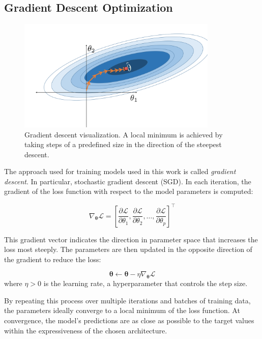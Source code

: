 \documentclass{pracalicmgr}
\begin{document}
\subsection{Gradient Descent Optimization}

\begin{figure}[H]
    \centering
    \includegraphics[width=0.85\textwidth]{src/gradienDescent.png}
    \caption{Gradient descent visualization. A local minimum is achieved by taking steps of a predefined size in the direction of the steepest descent.}
\end{figure}

The approach used for training models used in this work is called \textit{gradient descent}. In particular, stochastic gradient descent (SGD). In each iteration, the gradient of the loss function with respect to the model parameters is computed:

\[
\nabla_{\boldsymbol{\theta}} \mathcal{L} = \left[ \frac{\partial \mathcal{L}}{\partial \theta_1}, \frac{\partial \mathcal{L}}{\partial \theta_2}, \dots, \frac{\partial \mathcal{L}}{\partial \theta_p} \right]^\top
\]

This gradient vector indicates the direction in parameter space that increases the loss most steeply. The parameters are then updated in the opposite direction of the gradient to reduce the loss:

\[
\boldsymbol{\theta} \leftarrow \boldsymbol{\theta} - \eta \nabla_{\boldsymbol{\theta}} \mathcal{L}
\]
where \( \eta > 0 \) is the learning rate, a hyperparameter that controls the step size.

By repeating this process over multiple iterations and batches of training data, the parameters ideally converge to a local minimum of the loss function. At convergence, the model's predictions are as close as possible to the target values within the expressiveness of the chosen architecture.
\end{document}
